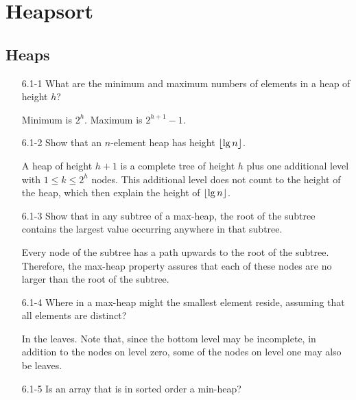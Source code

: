 \chapter{Heapsort}

\section{Heaps}

\begin{enumerate}

\item[6.1{-}1]{What are the minimum and maximum numbers of elements in a heap of
height $h$?}

\begin{framed}
Minimum is $2^{h}$. Maximum is $2^{h + 1} - 1$.
\end{framed}

\item[6.1{-}2]{Show that an $n$-element heap has height $\lfloor\lg n\rfloor$.}

\begin{framed}
A heap of height $h + 1$ is a complete tree of height $h$ plus one additional
level with $1 \le k \le 2^h$ nodes. This additional level does not count to the
height of the heap, which then explain the height of $\lfloor\lg n\rfloor$.
\end{framed}

\item[6.1{-}3]{Show that in any subtree of a max-heap, the root of the subtree
contains the largest value occurring anywhere in that subtree.}

\begin{framed}
  Every node of the subtree has a path upwards to the root of the subtree.
  Therefore, the max-heap property assures that each of these nodes are no
  larger than the root of the subtree.
\end{framed}

\item[6.1{-}4]{Where in a max-heap might the smallest element reside, assuming
that all elements are distinct?}

\begin{framed}
In the leaves. Note that, since the bottom level may be incomplete, in addition
to the nodes on level zero, some of the nodes on level one may also be leaves.
\end{framed}

\item[6.1{-}5]{Is an array that is in sorted order a min-heap?}


\end{enumerate}

